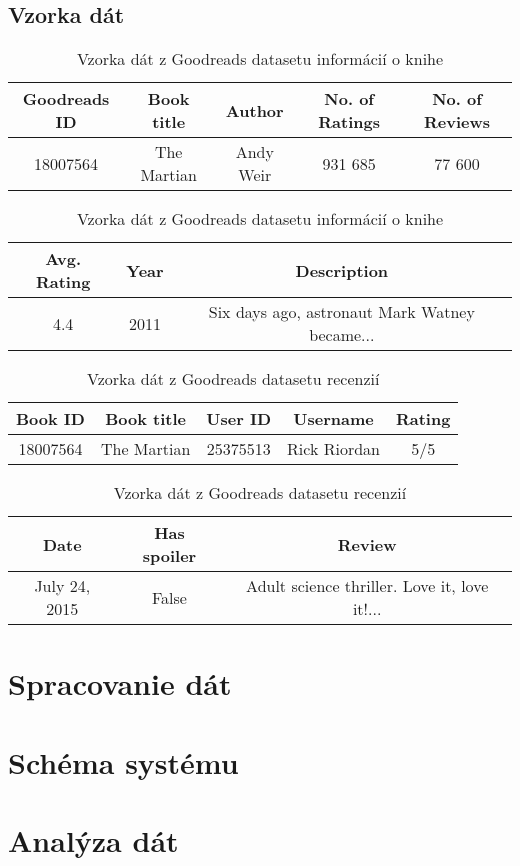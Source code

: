 \subsection*{Vzorka dát}

\begin{table}[hbt]
\centering
\caption{Vzorka dát z Goodreads datasetu informácií o knihe}
\label{bookinfo}
\begin{tabular}{|c|c|c|c|c|}
\hline
Goodreads ID & Book title & Author & No. of Ratings & No. of Reviews  \\
\hline
18007564 & The Martian & Andy Weir & 931 685 & 77 600\\ 
\hline
\end{tabular}
\begin{tabular}{|c|c|c|}
\hline
Avg. Rating & Year & Description \\
\hline
4.4  & 2011 & Six days ago, astronaut Mark Watney became... \\ 
\hline
\end{tabular}
\end{table}

\begin{table}[hbt]
\centering
\caption{Vzorka dát z Goodreads datasetu recenzií}
\label{reviewinfo}
\begin{tabular}{|c|c|c|c|c|}
\hline
Book ID & Book title & User ID  & Username & Rating  \\
\hline
18007564 & The Martian & 25375513 & Rick Riordan & 5/5\\ 
\hline
\end{tabular}
\begin{tabular}{|c|c|c|}
\hline
Date & Has spoiler & Review \\
\hline
July 24, 2015  & False & Adult science thriller.  Love it, love it!...\\ 
\hline
\end{tabular}
\end{table}



\section{Spracovanie dát}
\section{Schéma systému}
\section{Analýza dát}
